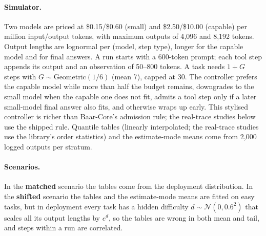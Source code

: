 \documentclass[11pt]{article}
\theoremstyle{remark}
\begin{document}
\paragraph{Simulator.}
Two models are priced at \$0.15/\$0.60 (small) and \$2.50/\$10.00 (capable) per
million input/output tokens, with maximum outputs of 4{,}096 and 8{,}192 tokens.
Output lengths are lognormal per (model, step type), longer for the capable
model and for final answers. A run starts with a 600-token prompt; each tool
step appends its output and an observation of 50--800 tokens. A task needs
$1 + G$ steps with $G \sim \mathrm{Geometric}(1/6)$ (mean 7), capped at 30. The
controller prefers the capable model while more than half the budget remains,
downgrades to the small model when the capable one does not fit, admits a tool
step only if a later small-model final answer also fits, and otherwise wraps up
early. This stylised controller is richer than Baar-Core's admission rule; the
real-trace studies below use the shipped rule. Quantile tables (linearly
interpolated; the real-trace studies use the library's order statistics) and the
estimate-mode means come from 2{,}000 logged outputs per stratum.

\paragraph{Scenarios.}
In the \textbf{matched} scenario the tables come from the deployment
distribution. In the \textbf{shifted} scenario the tables and the estimate-mode
means are fitted on easy tasks, but in deployment every task has a hidden
difficulty $d \sim \mathcal N(0, 0.6^2)$ that scales all its output lengths by
$e^{d}$, so the tables are wrong in both mean and tail, and steps within a run
are correlated.
\end{document}
